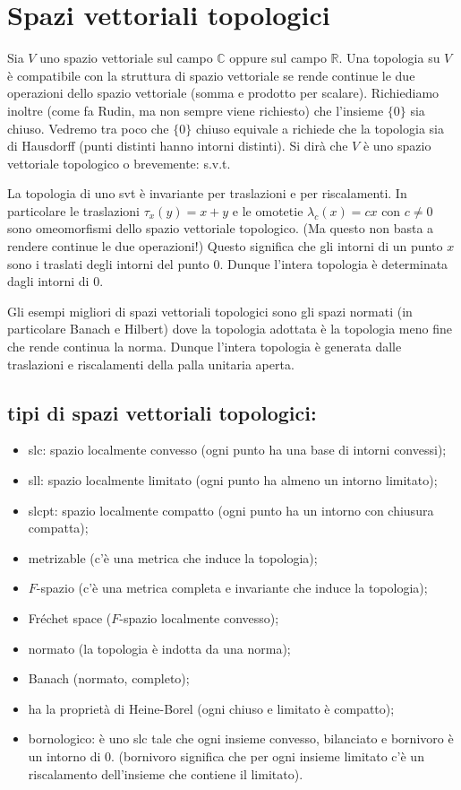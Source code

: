 \documentclass[italian,a4paper,oneside,headinclude]{scrbook}
\newcommand{\CC}{\mathbb C}
\newcommand{\RR}{\mathbb R}
\begin{document}
\chapter{Spazi vettoriali topologici}

Sia $V$ uno spazio vettoriale sul campo $\CC$ oppure sul campo $\RR$.
Una topologia su $V$ è compatibile con
la struttura di spazio vettoriale se rende continue le due operazioni
dello spazio vettoriale (somma e prodotto per scalare). Richiediamo
inoltre (come fa Rudin, ma non sempre viene richiesto) che l'insieme
$\{0\}$ sia chiuso. Vedremo tra poco che $\{0\}$ chiuso equivale a
richiede che la topologia sia di Hausdorff (punti distinti hanno
intorni distinti).
Si
dirà che $V$ è uno spazio vettoriale topologico o brevemente: s.v.t.

La topologia di uno svt è invariante per traslazioni e per
riscalamenti. In particolare le traslazioni $\tau_x(y)=x+y$ e le omotetie
$\lambda_c(x) =  cx$ con $c\neq 0$ sono omeomorfismi
dello spazio vettoriale topologico. (Ma questo non basta a rendere
continue le due operazioni!)
Questo significa che gli intorni di un punto $x$ sono i traslati degli
intorni del punto $0$. Dunque l'intera topologia è determinata dagli
intorni di $0$.

Gli esempi migliori di spazi vettoriali topologici sono gli spazi normati
(in particolare Banach e Hilbert) dove la topologia adottata è la
topologia meno fine che rende continua la norma. Dunque l'intera
topologia è generata dalle traslazioni e riscalamenti della palla
unitaria aperta.

\section{tipi di spazi vettoriali topologici:}
\begin{itemize}
\item slc: spazio localmente convesso (ogni punto ha una base di
  intorni convessi);
\item sll: spazio localmente limitato (ogni punto ha almeno un intorno
  limitato);
\item slcpt: spazio localmente compatto (ogni punto ha un intorno con
  chiusura compatta);
\item metrizable (c'è una metrica che induce la topologia);
\item $F$-spazio (c'è una metrica completa e invariante che induce la
  topologia);
\item Fréchet space ($F$-spazio localmente convesso);
\item normato (la topologia è indotta da una norma);
\item Banach (normato, completo);
\item ha la proprietà di Heine-Borel (ogni chiuso e limitato è compatto);
\item bornologico: è uno slc tale che ogni insieme convesso,
  bilanciato e bornivoro è un intorno di $0$. (bornivoro significa che
  per ogni insieme limitato c'è un riscalamento dell'insieme che
  contiene il limitato).
\end{itemize}
\end{document}
